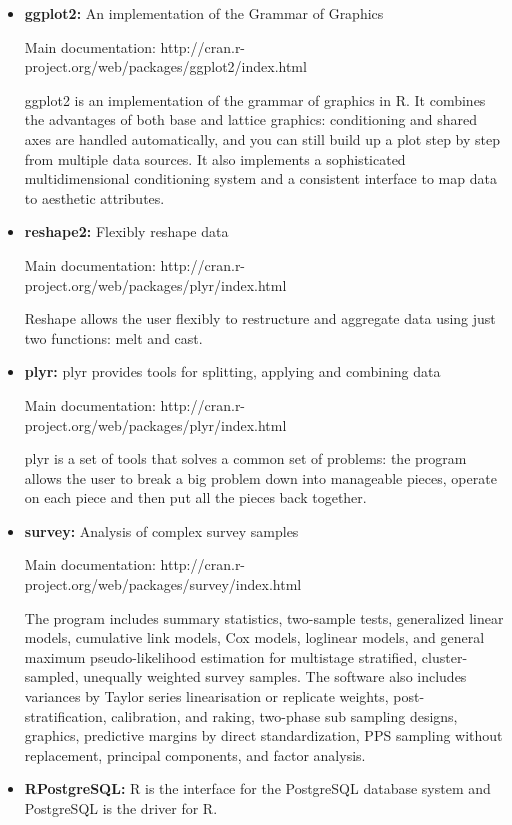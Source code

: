 \documentclass[12pt,letterpaper]{report}
\begin{document}
\begin{itemize}
\begin{itemize}
\item \textbf{ggplot2:} An implementation of the Grammar of Graphics \cite{wickham2009ggplot2}
	
Main documentation: http://cran.r-project.org/web/packages/ggplot2/index.html

ggplot2 is an implementation of the grammar of graphics in R. It combines the advantages of both base and lattice graphics: conditioning and shared axes are handled automatically, and you can still build up a plot step by step from multiple data sources. It also implements a sophisticated multidimensional conditioning system and a consistent interface to map data to aesthetic attributes. 
	
\item \textbf{reshape2:} Flexibly reshape data \cite{wickham2007reshape2}

Main documentation: http://cran.r-project.org/web/packages/plyr/index.html

Reshape allows the user flexibly to restructure and aggregate data using just two functions: melt and cast. 
	
\item \textbf{plyr:} plyr provides tools for splitting, applying and combining data \cite{wickham2011plyr}

Main documentation: http://cran.r-project.org/web/packages/plyr/index.html

plyr is a set of tools that solves a common set of problems: the program allows the user to break a big problem down into manageable pieces, operate on each piece and then put all the pieces back together. 

\item \textbf{survey:} Analysis of complex survey samples \cite{lumley2004analysis}

Main documentation: http://cran.r-project.org/web/packages/survey/index.html

The program includes summary statistics, two-sample tests, generalized linear models, cumulative link models, Cox models, loglinear models, and general maximum pseudo-likelihood estimation for multistage stratified, cluster-sampled, unequally weighted survey samples. The software also includes variances by Taylor series linearisation or replicate weights, post-stratification, calibration, and raking, two-phase sub sampling designs, graphics, predictive margins by direct standardization, PPS sampling without replacement, principal components, and factor analysis.

\item \textbf{RPostgreSQL:} R is the interface for the PostgreSQL database system and PostgreSQL is the driver for R. 


\end{itemize}
\end{itemize}
\end{document}
